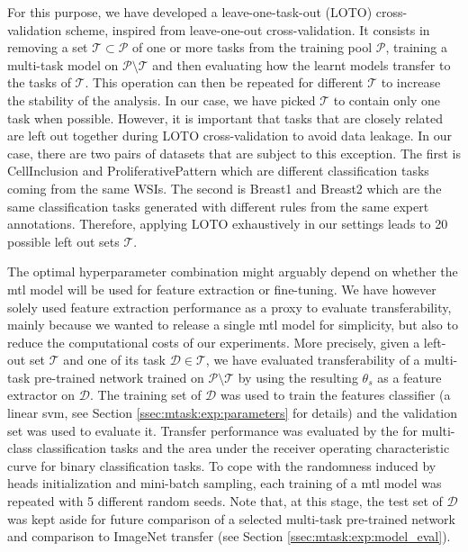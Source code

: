 For this purpose, we have developed a leave-one-task-out (LOTO) cross-validation scheme, inspired from leave-one-out cross-validation. It consists in removing a set $\mathcal{T} \subset \mathcal{P}$ of one or more tasks from the training pool $\mathcal{P}$, training a multi-task model on $\mathcal{P} \setminus \mathcal{T}$ and then evaluating how the learnt models transfer to the tasks of $\mathcal{T}$. This operation can then be repeated for different $\mathcal{T}$ to increase the stability of the analysis. In our case, we have picked $\mathcal{T}$ to contain only one task when possible. However, it is important that tasks that are closely related are left out together during LOTO cross-validation to avoid data leakage. In our case, there are two pairs of datasets that are subject to this exception. The first is CellInclusion and ProliferativePattern which are different classification tasks coming from the same WSIs. The second is Breast1 and Breast2 which are the same classification tasks generated with different rules from the same expert annotations. Therefore, applying LOTO exhaustively in our settings leads to 20 possible left out sets $\mathcal{T}$. 

The optimal hyperparameter combination might arguably depend on whether the \acrshort{mtl} model will be used for feature extraction or fine-tuning. We have however solely used feature extraction performance as a proxy to evaluate transferability, mainly because we wanted to release a single \acrshort{mtl} model for simplicity, but also to reduce the computational costs of our experiments. More precisely, given a left-out set $\mathcal{T}$ and one of its task $\mathcal{D} \in \mathcal{T}$, we have evaluated transferability of a multi-task pre-trained network trained on $\mathcal{P} \setminus \mathcal{T}$ by using the resulting $\theta_s$ as a feature extractor on $\mathcal{D}$. The training set of $\mathcal{D}$ was used to train the features classifier (\ie a linear \acrshort{svm}, see Section \ref{ssec:mtask:exp:parameters} for details) and the validation set was used to evaluate it. Transfer performance was evaluated by the  for multi-class classification tasks and the area under the receiver operating characteristic curve \rocauc for binary classification tasks. To cope with the randomness induced by heads initialization and mini-batch sampling, each training of a \acrshort{mtl} model was repeated with 5 different random seeds. Note that, at this stage, the test set of $\mathcal{D}$ was kept aside for future comparison of a selected multi-task pre-trained network and comparison to ImageNet transfer (see Section \ref{ssec:mtask:exp:model_eval}).

